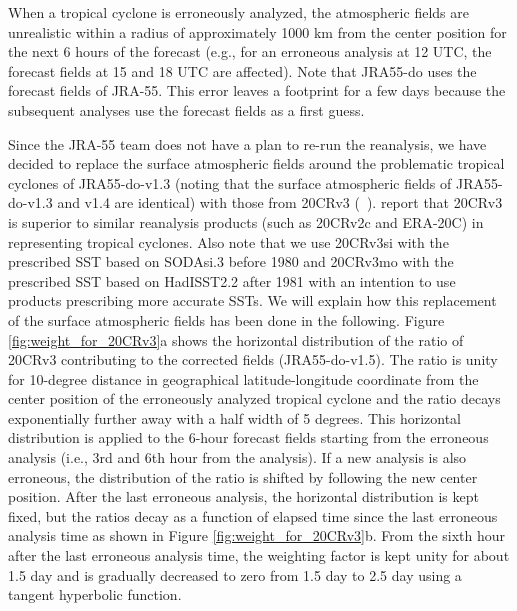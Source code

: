 \documentclass[dvipdfmx]{elsarticle_mod}
\begin{document}
When a tropical cyclone is erroneously analyzed, the atmospheric fields are unrealistic within a radius of approximately 1000 km from the center position for the next 6 hours of the forecast (e.g., for an erroneous analysis at 12 UTC, the forecast fields at 15 and 18 UTC are affected). Note that JRA55-do uses the forecast fields of JRA-55. This error leaves a footprint for a few days because the subsequent analyses use the forecast fields as a first guess.

Since the JRA-55 team does not have a plan to re-run the reanalysis, we have decided to replace the surface atmospheric fields around the problematic tropical cyclones of JRA55-do-v1.3 (noting that the surface atmospheric fields of JRA55-do-v1.3 and v1.4 are identical) with those from 20CRv3 (\citeauthor{Slivinski_et_al_2019}~\citeyear{Slivinski_et_al_2019}). \citet{Slivinski_et_al_2019} report that 20CRv3 is superior to similar reanalysis products (such as 20CRv2c and ERA-20C) in representing tropical cyclones. Also note that we use 20CRv3si with the prescribed SST based on SODAsi.3 before 1980 and 20CRv3mo with the prescribed SST based on HadISST2.2 after 1981 with an intention to use products prescribing more accurate SSTs. We will explain how this replacement of the surface atmospheric fields has been done in the following. Figure \ref{fig:weight_for_20CRv3}a shows the horizontal distribution of the ratio of 20CRv3 contributing to the corrected fields (JRA55-do-v1.5). The ratio is unity for 10-degree distance in geographical latitude-longitude coordinate from the center position of the erroneously analyzed tropical cyclone and the ratio decays exponentially further away with a half width of 5 degrees. This horizontal distribution is applied to the 6-hour forecast fields starting from the erroneous analysis (i.e., 3rd and 6th hour from the analysis). If a new analysis is also erroneous, the distribution of the ratio is shifted by following the new center position. After the last erroneous analysis, the horizontal distribution is kept fixed, but the ratios decay as a function of elapsed time since the last erroneous analysis time as shown in Figure \ref{fig:weight_for_20CRv3}b. From the sixth hour after the last erroneous analysis time, the weighting factor is kept unity for about 1.5 day and is gradually decreased to zero from 1.5 day to 2.5 day using a tangent hyperbolic function.
\end{document}
